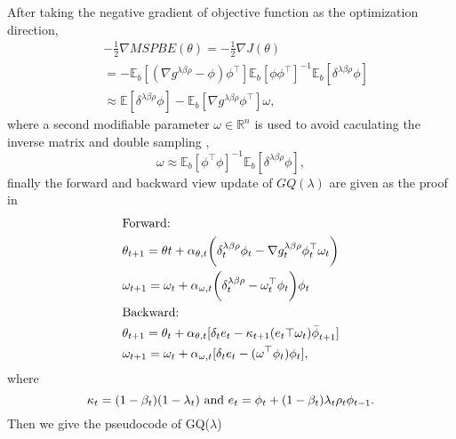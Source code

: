 \documentclass[conference]{IEEEtran}
\begin{document}
After taking the negative gradient of objective function as the optimization direction,
\begin{equation}
\begin{split}
  &-\frac{1}{2}\nabla MSPBE(\theta) =-\frac{1}{2}\nabla J(\theta) \\
  &= -\mathbb{E}_b[(\nabla g^{\lambda \beta\rho} - \phi) \phi^\top ]\mathbb{E}_b[\phi\phi^\top ]^{-1}\mathbb{E}_b[\delta^{\lambda\beta\rho}\phi]\\
  &\approx \mathbb{E}[\delta^{\lambda\beta\rho}\phi]-\mathbb{E}_b[\nabla g^{\lambda \beta\rho}\phi^\top ]\omega,
  \end{split}
\end{equation}
where a second modifiable parameter $\omega\in\mathbb{R}^n$ is used to avoid caculating the inverse matrix and double sampling \cite{sutton1998reinforcement},
\begin{equation}
  \omega\approx \mathbb{E}_b[\phi^\top \phi]^{-1}\mathbb{E}_b[\delta^{\lambda\beta\rho}\phi],
\end{equation}
finally the forward and backward view update of $GQ(\lambda)$ are given as the proof in \cite{maei2010gq}
\begin{equation}
\begin{split}
  &\textup{Forward:}\\
  &\theta_{t+1}=\theta{t}+\alpha_{\theta, t}\bigg(\delta^{\lambda\beta\rho}_t\phi_t-\nabla g^{\lambda\beta\rho}_t\phi_t^\top\omega_t\bigg)\\
  &\omega_{t+1}=\omega_t+\alpha_{\omega, t}\bigg(\delta^{\lambda\beta\rho}_t-\omega_t^\top\phi_t\bigg)\phi_t\\
  &\textup{Backward:}\\
  &\theta_{t+1}=\theta_t+\alpha_{\theta, t}[\delta_te_t-\kappa_{t+1}({e_t}\top \omega_{t}){\bar{\phi}}_{t+1}]\\
  &\omega_{t+1}=\omega_{t}+\alpha_{\omega, t}[\delta_te_t-(\omega^\top\phi_t)\phi_t],
\end{split}
\end{equation}
where
\begin{equation}
\kappa_t=(1-\beta_t)(1-\lambda_t) \ \textup{and} \ e_t=\phi_t+(1-\beta_t)\lambda_t\rho_t\phi_{t-1}.
\end{equation}
Then we give the pseudocode of GQ($\lambda$)\\
\end{document}
